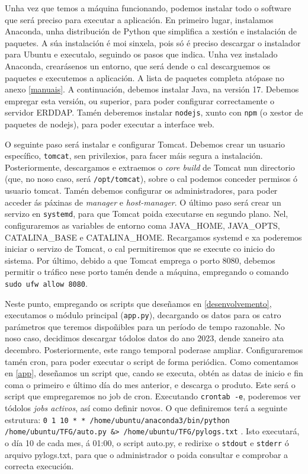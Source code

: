 Unha vez que temos a máquina funcionando, podemos instalar todo o software que será preciso para executar a aplicación. En primeiro lugar, instalamos Anaconda, unha distribución de Python que
simplifica a xestión e instalación de paquetes. A súa instalación é moi sinxela, pois só é preciso descargar o instalador para Ubuntu e executalo, seguindo os pasos que indica. Unha vez instalado
Anaconda, crearásenos un entorno, que será dende o cal descarguemos os paquetes e executemos a aplicación. A lista de paquetes completa atópase no anexo \ref{manuais}. A continuación, debemos
instalar Java, na versión 17. Debemos empregar esta versión, ou superior, para poder configurar correctamente o servidor ERDDAP. Tamén deberemos instalar \texttt{nodejs}, xunto con \texttt{npm} (o
xestor de paquetes de nodejs), para poder executar a interface web.

O seguinte paso será instalar e configurar Tomcat. Debemos crear un usuario específico, \texttt{tomcat}, sen privilexios, para facer máis segura a instalación. Posteriormente, descargamos e
extraemos o \textit{core build} de Tomcat nun directorio (que, no noso caso, será \texttt{/opt/tomcat}), sobre o cal podemos conceder permisos ó usuario tomcat. Tamén debemos configurar os
administradores, para poder acceder ás páxinas de \textit{manager} e \textit{host-manager}. O último paso será crear un servizo en \texttt{systemd}, para que Tomcat poida executarse en segundo plano.
Nel, configuraremos as variables de entorno coma JAVA\_HOME, JAVA\_OPTS, CATALINA\_BASE e CATALINA\_HOME. Recargamos systemd e xa poderemos iniciar o servizo de Tomcat, o cal permitiremos que se
execute co inicio do sistema. Por último, debido a que Tomcat emprega o porto 8080, debemos permitir o tráfico nese porto tamén dende a máquina, empregando o comando \texttt{sudo ufw allow 8080}.

Neste punto, empregando os scripts que deseñamos en \ref{desenvolvemento}, executamos o módulo principal (\texttt{app.py}), decargando os datos para os catro parámetros que teremos dispoñibles para
un período de tempo razonable. No noso caso, decidimos descargar tódolos datos do ano 2023, dende xaneiro ata decembro. Posteriormente, este rango temporal poderase ampliar. Configuraremos tamén
cron, para poder executar o script de forma periódica. Como comentamos en \ref{app}, deseñamos un script que, cando se executa, obtén as datas de inicio e fin coma o primeiro e último día do mes
anterior, e descarga o produto. Este será o script que empregaremos no job de cron. Executando \texttt{crontab -e}, poderemos ver tódolos \textit{jobs activos}, así como definir novos. O que
definiremos terá a seguinte estrutura: \texttt{0 1 10 * * /home/ubuntu/anaconda3/bin/python /home/ubuntu/TFG/auto.py \break \&> /home/ubuntu/TFG/pylogs.txt} . Isto executará, o día 10 de cada mes,
á 01:00, o script auto.py, e redirixe o \texttt{stdout} e \texttt{stderr} ó arquivo pylogs.txt, para que o administrador o poida consultar e comprobar a correcta execución.

